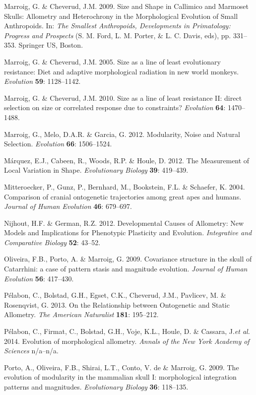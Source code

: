 \documentclass[12pt,]{article}
\begin{document}
Marroig, G. \& Cheverud, J.M. 2009. Size and Shape in Callimico and
Marmoset Skulls: Allometry and Heterochrony in the Morphological
Evolution of Small Anthropoids. In: \emph{The Smallest Anthropoids,
Developments in Primatology: Progress and Prospects} (S. M. Ford, L. M.
Porter, \& L. C. Davis, eds), pp. 331--353. Springer US, Boston.

Marroig, G. \& Cheverud, J.M. 2005. Size as a line of least evolutionary
resistance: Diet and adaptive morphological radiation in new world
monkeys. \emph{Evolution} \textbf{59}: 1128--1142.

Marroig, G. \& Cheverud, J.M. 2010. Size as a line of least resistance
II: direct selection on size or correlated response due to constraints?
\emph{Evolution} \textbf{64}: 1470--1488.

Marroig, G., Melo, D.A.R. \& Garcia, G. 2012. Modularity, Noise and
Natural Selection. \emph{Evolution} \textbf{66}: 1506--1524.

Márquez, E.J., Cabeen, R., Woods, R.P. \& Houle, D. 2012. The
Measurement of Local Variation in Shape. \emph{Evolutionary Biology}
\textbf{39}: 419--439.

Mitteroecker, P., Gunz, P., Bernhard, M., Bookstein, F.L. \& Schaefer,
K. 2004. Comparison of cranial ontogenetic trajectories among great apes
and humans. \emph{Journal of Human Evolution} \textbf{46}: 679--697.

Nijhout, H.F. \& German, R.Z. 2012. Developmental Causes of Allometry:
New Models and Implications for Phenotypic Plasticity and Evolution.
\emph{Integrative and Comparative Biology} \textbf{52}: 43--52.

Oliveira, F.B., Porto, A. \& Marroig, G. 2009. Covariance structure in
the skull of Catarrhini: a case of pattern stasis and magnitude
evolution. \emph{Journal of Human Evolution} \textbf{56}: 417--430.

Pélabon, C., Bolstad, G.H., Egset, C.K., Cheverud, J.M., Pavlicev, M. \&
Rosenqvist, G. 2013. On the Relationship between Ontogenetic and Static
Allometry. \emph{The American Naturalist} \textbf{181}: 195--212.

Pélabon, C., Firmat, C., Bolstad, G.H., Voje, K.L., Houle, D. \&
Cassara, J.\emph{et al.} 2014. Evolution of morphological allometry.
\emph{Annals of the New York Academy of Sciences} n/a--n/a.

Porto, A., Oliveira, F.B., Shirai, L.T., Conto, V. de \& Marroig, G.
2009. The evolution of modularity in the mammalian skull I:
morphological integration patterns and magnitudes. \emph{Evolutionary
Biology} \textbf{36}: 118--135.
\end{document}
